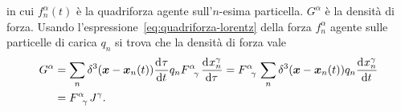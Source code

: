 in cui $f_{n}^{\alpha}(t)$ è la quadriforza agente sull'$n$-esima particella.
$G^{\alpha}$ è la densità di forza.  Usando
l'espressione~\eqref{eq:quadriforza-lorentz} della forza $f_{n}^{\alpha}$ agente
sulle particelle di carica $q_{n}$ si trova che la densità di forza vale
\begin{equation}
  \begin{split}
    G^{\alpha} &= \sum_{n} \delta^{3}(\bm{x} - \bm{x}_{n}(t))
    \toder{\tau}{t}q_{n} \tensor{F}{^{\alpha}_{\gamma}}
    \toder{x_{n}^{\gamma}}{\tau} = \tensor{F}{^{\alpha}_{\gamma}} \sum_{n}
    \delta^{3}(\bm{x} - \bm{x}_{n}(t)) q_{n} \toder{x_{n}^{\gamma}}{t} \\
    &= \tensor{F}{^{\alpha}_{\gamma}} J^{\gamma}.
  \end{split}
\end{equation}

